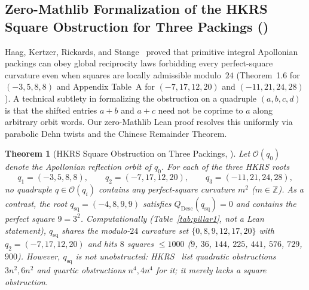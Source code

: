 \documentclass[11pt,reqno]{amsart}
\theoremstyle{plain}
\newtheorem{theorem}{Theorem}[section]
\theoremstyle{definition}
\newcommand{\ZZ}{\mathbb{Z}}
\newcommand{\code}[1]{\texttt{\detokenize{#1}}}
\begin{document}
\subsection{Zero-Mathlib Formalization of the HKRS Square Obstruction for Three Packings (\texorpdfstring{\code{T1c}}{T1c})}

Haag, Kertzer, Rickards, and Stange~\cite{hkrs2024} proved that primitive integral Apollonian packings can obey global reciprocity laws forbidding every perfect-square curvature even when squares are locally admissible modulo~$24$ (Theorem~1.6 for $(-3,5,8,8)$ and Appendix Table~A for $(-7,17,12,20)$ and $(-11,21,24,28)$). A technical subtlety in formalizing the obstruction on a quadruple $(a,b,c,d)$ is that the shifted entries $a+b$ and $a+c$ need not be coprime to $a$ along arbitrary orbit words. Our zero-Mathlib Lean proof resolves this uniformly via parabolic Dehn twists and the Chinese Remainder Theorem.

\begin{theorem}[HKRS Square Obstruction on Three Packings, \code{T1c}]
\label{thm:t1c}
Let $\mathcal{O}(q_0)$ denote the Apollonian reflection orbit of $q_0$. For each of the three HKRS roots
\begin{equation}
  q_1 = (-3, 5, 8, 8), \qquad q_2 = (-7, 17, 12, 20), \qquad q_3 = (-11, 21, 24, 28),
\end{equation}
no quadruple $q \in \mathcal{O}(q_i)$ contains any perfect-square curvature $m^2$ ($m \in \ZZ$). As a contrast, the root $q_{\mathrm{sq}} = (-4, 8, 9, 9)$ satisfies $Q_{\mathrm{Desc}}(q_{\mathrm{sq}}) = 0$ and contains the perfect square $9 = 3^2$. Computationally (Table~\ref{tab:pillar1}, not a Lean statement), $q_{\mathrm{sq}}$ shares the modulo-$24$ curvature set $\{0, 8, 9, 12, 17, 20\}$ with $q_2 = (-7, 17, 12, 20)$ and hits $8$ squares $\le 1000$ ($9$, $36$, $144$, $225$, $441$, $576$, $729$, $900$). However, $q_{\mathrm{sq}}$ is \emph{not} unobstructed: HKRS~\cite[Appendix Table~A]{hkrs2024} list quadratic obstructions $3n^2, 6n^2$ and quartic obstructions $n^4, 4n^4$ for it; it merely lacks a square obstruction.
\end{theorem}
\end{document}
